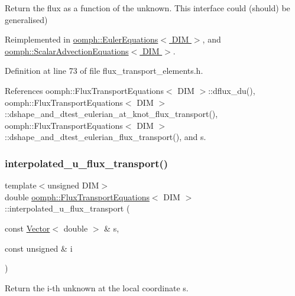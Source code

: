 Return the flux as a function of the unknown. This interface could (should) be generalised) 



Reimplemented in \hyperlink{classoomph_1_1EulerEquations_a2596b0523e6e40d3ece23f9fd0c6d97c}{oomph\+::\+Euler\+Equations$<$ D\+I\+M $>$}, and \hyperlink{classoomph_1_1ScalarAdvectionEquations_af5a06cfaa7bff5d831b739545a57580f}{oomph\+::\+Scalar\+Advection\+Equations$<$ D\+I\+M $>$}.



Definition at line 73 of file flux\+\_\+transport\+\_\+elements.\+h.



References oomph\+::\+Flux\+Transport\+Equations$<$ D\+I\+M $>$\+::dflux\+\_\+du(), oomph\+::\+Flux\+Transport\+Equations$<$ D\+I\+M $>$\+::dshape\+\_\+and\+\_\+dtest\+\_\+eulerian\+\_\+at\+\_\+knot\+\_\+flux\+\_\+transport(), oomph\+::\+Flux\+Transport\+Equations$<$ D\+I\+M $>$\+::dshape\+\_\+and\+\_\+dtest\+\_\+eulerian\+\_\+flux\+\_\+transport(), and s.

\mbox{\label{classoomph_1_1FluxTransportEquations_a919f56a48a7ab618c90ceb41da5afaeb}} 
\subsubsection{\texorpdfstring{interpolated\+\_\+u\+\_\+flux\+\_\+transport()}{interpolated\_u\_flux\_transport()}}
{\footnotesize\ttfamily template$<$unsigned D\+IM$>$ \\
double \hyperlink{classoomph_1_1FluxTransportEquations}{oomph\+::\+Flux\+Transport\+Equations}$<$ D\+IM $>$\+::interpolated\+\_\+u\+\_\+flux\+\_\+transport (\begin{DoxyParamCaption}\item[{const \hyperlink{classoomph_1_1Vector}{Vector}$<$ double $>$ \&}]{s,  }\item[{const unsigned \&}]{i }\end{DoxyParamCaption})}



Return the i-\/th unknown at the local coordinate s. 



